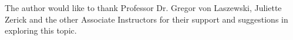 \documentclass[sigconf]{acmart}
\begin{document}



 
 
 
\begin{acks}
The author would like to thank Professor Dr. Gregor von Laszewski, Juliette Zerick and the other Associate Instructors for their support and suggestions in exploring this topic.
\end{acks}


 

%
\end{document}
